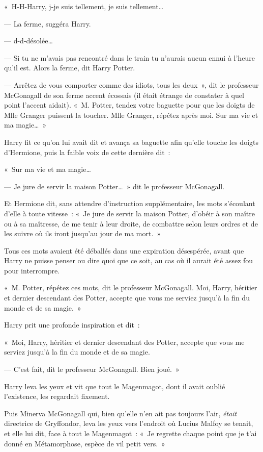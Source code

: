 «~H-H-Harry, j-je suis tellement, je suis tellement…

--- La ferme, suggéra Harry.

--- d-d-désolée…

--- Si tu ne m'avais pas rencontré dans le train tu n'aurais aucun ennui à l'heure qu'il est. Alors la ferme, dit Harry Potter.

--- Arrêtez de vous comporter comme des idiots, tous les deux~», dit le professeur McGonagall de son ferme accent écossais (il était étrange de constater à quel point l'accent aidait). «~M. Potter, tendez votre baguette pour que les doigts de Mlle Granger puissent la toucher. Mlle Granger, répétez après moi. Sur ma vie et ma magie…~»

Harry fit ce qu'on lui avait dit et avança sa baguette afin qu'elle touche les doigts d'Hermione, puis la faible voix de cette dernière dit~:

«~Sur ma vie et ma magie…

--- Je jure de servir la maison Potter…~» dit le professeur McGonagall.

Et Hermione dit, sans attendre d'instruction supplémentaire, les mots s'écoulant d'elle à toute vitesse~: «~Je jure de servir la maison Potter, d'obéir à son maître ou à sa maîtresse, de me tenir à leur droite, de combattre selon leurs ordres et de les suivre où ils iront jusqu'au jour de ma mort.~»

Tous ces mots avaient été déballés dans une expiration désespérée, avant que Harry ne puisse penser ou dire quoi que ce soit, au cas où il aurait été assez fou pour interrompre.

«~M. Potter, répétez ces mots, dit le professeur McGonagall. Moi, Harry, héritier et dernier descendant des Potter, accepte que vous me serviez jusqu'à la fin du monde et de sa magie.~»

Harry prit une profonde inspiration et dit~:

«~Moi, Harry, héritier et dernier descendant des Potter, accepte que vous me serviez jusqu'à la fin du monde et de sa magie.

--- C'est fait, dit le professeur McGonagall. Bien joué.~»

Harry leva les yeux et vit que tout le Magenmagot, dont il avait oublié l'existence, les regardait fixement.

Puis Minerva McGonagall qui, bien qu'elle n'en ait pas toujours l'air, \emph{était} directrice de Gryffondor, leva les yeux vers l'endroit où Lucius Malfoy se tenait, et elle lui dit, face à tout le Magenmagot~: «~Je regrette chaque point que je t'ai donné en Métamorphose, espèce de vil petit vers.~»

